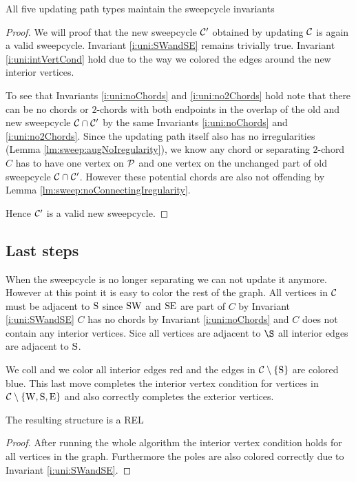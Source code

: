     \begin{lemma}
      All five updating path types maintain the sweepcycle invariants
    \end{lemma}
    \begin{proof}
      We will proof that the new sweepcycle $\C'$ obtained by updating $\C$ is again a valid sweepcycle. Invariant \ref{i:uni:SWandSE} remains trivially true. Invariant \ref{i:uni:intVertCond} hold due to the way we colored the edges around the new interior vertices.

      To see that Invariants \ref{i:uni:noChords} and \ref{i:uni:no2Chords} hold note that there can be no chords or $2$-chords with both endpoints in the overlap of the old and new sweepcycle $\C \cap \C'$ by the same Invariants \ref{i:uni:noChords} and \ref{i:uni:no2Chords}. Since the updating path itself also has no irregularities (Lemma \ref{lm:sweep:augNoIregularity}),
      we know any chord or separating $2$-chord $C$ has to have one vertex on $\P$ and one vertex on the unchanged part of old sweepcycle $\C \cap \C'$. However these potential chords are also not offending by Lemma \ref{lm:sweep:noConnectingIregularity}.

      Hence $\C'$ is a valid new sweepcycle.
    \end{proof}

    \subsection{Last steps}
    When the sweepcycle is no longer separating we can not update it anymore. However at this point it is easy to color the rest of the graph. All vertices in $\C$ must be adjacent to $\pS$ since $\pS \pW$ and $\pS \pE$ are part of $C$ by Invariant \ref{i:uni:SWandSE} $C$ has no chords by Invariant \ref{i:uni:noChords} and $C$ does not contain any interior vertices. Sice all vertices are adjacent to $\S$ all interior edges are adjacent to $\pS$.

    We coll and we color all interior edges red and the edges in $\cpath$ are colored blue. This last move completes the interior vertex condition for vertices in $\C \sm {\pW, \pS, \pE}$ and also correctly completes the exterior vertices.


    \begin{lemma}
      \label{lm:sweep:REL}
      The resulting structure is a REL
    \end{lemma}

    \begin{proof}
      After running the whole algorithm the interior vertex condition holds for all vertices in the graph. Furthermore the poles are also colored correctly due to Invariant \ref{i:uni:SWandSE}.
    \end{proof}

